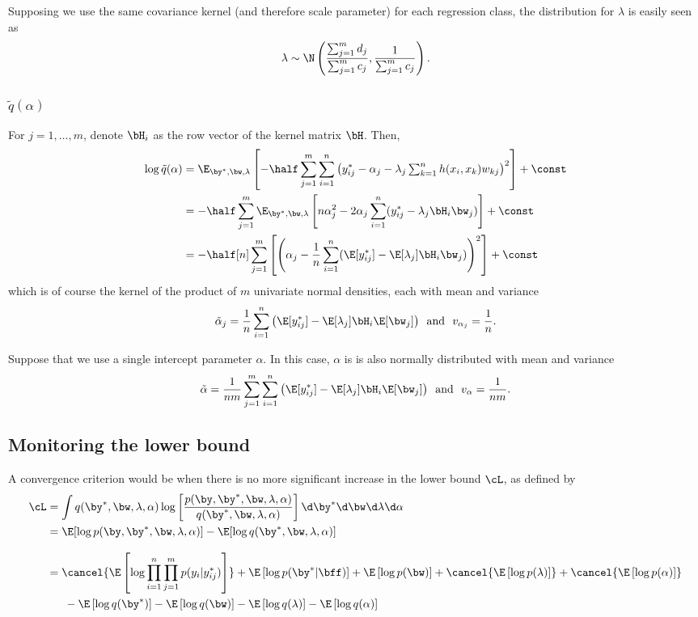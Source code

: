 Supposing we use the same covariance kernel (and therefore scale parameter) for each regression class, the distribution for $\lambda$ is easily seen as
\[
  \lambda \sim \N \left( \frac{\sum_{j=1}^m d_j}{\sum_{j=1}^m c_j}, \frac{1}{\sum_{j=1}^m c_j} \right).
\]

\subsubsection{$\tilde q(\alpha)$}

For $j = 1,\dots,m$, denote $\bH_i$ as the row vector of the kernel matrix $\bH$. Then,
\begin{align*}
  \log \tilde q(\alpha) 
  &= \E_{\by^*, \bw, \lambda} \left[ 
  - \half \sum_{j=1}^m \sum_{i=1}^n \left( y_{ij}^* - \alpha_j 
  - \lambda_j \textstyle\sum_{k=1}^n h(x_i, x_k)w_{kj} \right)^2  
  \right] + \const \\  
  &= - \half \sum_{j=1}^m \E_{\by^*, \bw, \lambda} \left[ 
  n \alpha_j^2 - 2\alpha_j \sum_{i=1}^n(y_{ij}^* - \lambda_j \bH_i \bw_j) 
  \right] + \const \\  
  &= - \half[n] \sum_{j=1}^m \left[ \left( \alpha_j - \frac{1}{n} \sum_{i=1}^n(\E[y_{ij}^*] - \E[\lambda_j] \bH_i \bw_j) \right)^2 \right] + \const \\  
\end{align*}
which is of course the kernel of the product of $m$ univariate normal densities, each with mean and variance 
\[
   \tilde \alpha_j = \frac{1}{n} \sum_{i=1}^n \big(\E [y_{ij}^*] - \E[\lambda_j]\bH_i \E[\bw_j]  \big)
   \ \text{ and } \ 
   v_{\alpha_j} = \frac{1}{n}.
\]

Suppose that we use a single intercept parameter $\alpha$. In this case, $\alpha$ is is also normally distributed with mean and variance
\[
   \tilde \alpha = \frac{1}{nm} \sum_{j=1}^m \sum_{i=1}^n \big(\E [y_{ij}^*] - \E[\lambda_j]\bH_i \E[\bw_j]  \big)
   \ \text{ and } \ 
   v_{\alpha} = \frac{1}{nm}.
\]

\subsection{Monitoring the lower bound}

A convergence criterion would be when there is no more significant increase in the lower bound $\cL$, as defined by
\begin{align*}
  \cL &= \int q(\by^*,\bw,\lambda,\alpha) \log \left[ \frac{p(\by,\by^*,\bw,\lambda,\alpha)}{q(\by^*,\bw,\lambda,\alpha)} \right] \d\by^* \d\bw \d\lambda \d\alpha \\
  &= \E[\log p(\by,\by^*,\bw,\lambda,\alpha)] - \E[\log q(\by^*,\bw,\lambda,\alpha)] \\[8pt]
  &= \cancel{\E\left[\log \prod_{i=1}^n \prod_{j=1}^m p(y_{i}|y_{ij}^*)\right]}
  + \E\left[ \log p(\by^* | \bff) \right]
  + \E\left[ \log p(\bw) \right] 
  + \cancel{\E\left[ \log p(\lambda) \right]}
  + \cancel{\E\left[ \log p(\alpha) \right]}  \\
  &\phantom{==} - \E\left[ \log q(\by^*) \right]
  - \E\left[ \log q(\bw) \right]
  - \E\left[ \log q(\lambda) \right]
  - \E\left[ \log q(\alpha) \right]
\end{align*}

